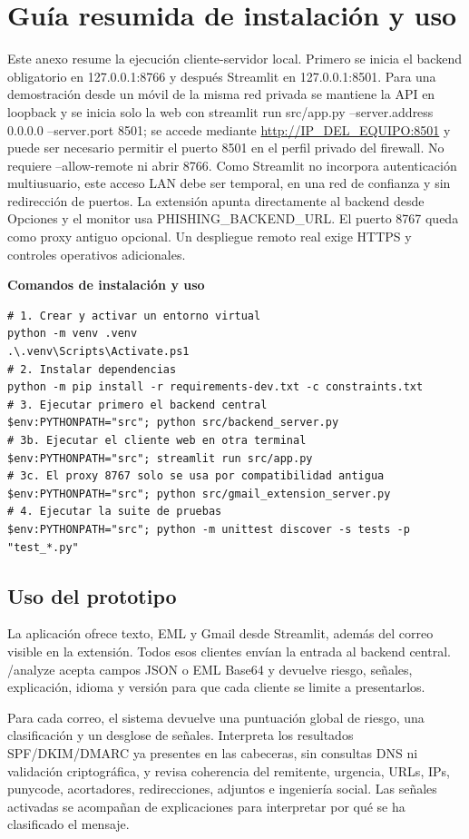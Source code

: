 \documentclass[11pt,a4paper,oneside]{report}
\begin{document}
\chapter{Guía resumida de instalación y uso}

Este anexo resume la ejecución cliente-servidor local. Primero se inicia el backend obligatorio en 127.0.0.1:8766 y después Streamlit en 127.0.0.1:8501. Para una demostración desde un móvil de la misma red privada se mantiene la API en loopback y se inicia solo la web con streamlit run src/app.py --server.address 0.0.0.0 --server.port 8501; se accede mediante \url{http://IP_DEL_EQUIPO:8501} y puede ser necesario permitir el puerto 8501 en el perfil privado del firewall. No requiere --allow-remote ni abrir 8766. Como Streamlit no incorpora autenticación multiusuario, este acceso LAN debe ser temporal, en una red de confianza y sin redirección de puertos. La extensión apunta directamente al backend desde Opciones y el monitor usa PHISHING\_BACKEND\_URL. El puerto 8767 queda como proxy antiguo opcional. Un despliegue remoto real exige HTTPS y controles operativos adicionales.

\textbf{Comandos de instalación y uso}

\begin{lstlisting}
# 1. Crear y activar un entorno virtual
python -m venv .venv
.\.venv\Scripts\Activate.ps1
# 2. Instalar dependencias
python -m pip install -r requirements-dev.txt -c constraints.txt
# 3. Ejecutar primero el backend central
$env:PYTHONPATH="src"; python src/backend_server.py
# 3b. Ejecutar el cliente web en otra terminal
$env:PYTHONPATH="src"; streamlit run src/app.py
# 3c. El proxy 8767 solo se usa por compatibilidad antigua
$env:PYTHONPATH="src"; python src/gmail_extension_server.py
# 4. Ejecutar la suite de pruebas
$env:PYTHONPATH="src"; python -m unittest discover -s tests -p "test_*.py"
\end{lstlisting}

\section{Uso del prototipo}

La aplicación ofrece texto, EML y Gmail desde Streamlit, además del correo visible en la extensión. Todos esos clientes envían la entrada al backend central. /analyze acepta campos JSON o EML Base64 y devuelve riesgo, señales, explicación, idioma y versión para que cada cliente se limite a presentarlos.

Para cada correo, el sistema devuelve una puntuación global de riesgo, una clasificación y un desglose de señales. Interpreta los resultados SPF/DKIM/DMARC ya presentes en las cabeceras, sin consultas DNS ni validación criptográfica, y revisa coherencia del remitente, urgencia, URLs, IPs, punycode, acortadores, redirecciones, adjuntos e ingeniería social. Las señales activadas se acompañan de explicaciones para interpretar por qué se ha clasificado el mensaje.
\end{document}
